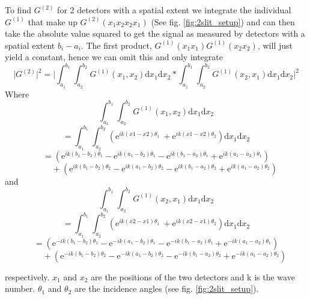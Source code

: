 \documentclass{article}
\begin{document}
To find \(G^{(2)}\) for 2 detectors with a spatial extent we integrate the individual \(G^{(1)}\) that make up \(G^{(2)}(x_1 x_2 x_2 x_1)\) (See fig. \ref{fig:2slit_setup}) and can then take the absolute value squared to get the signal as measured by detectors with a spatial extent \(b_i-a_i\). The first product, \(G^{(1)}(x_1 x_1) G^{(1)}(x_2 x_2)\), will just yield a constant, hence we can omit this and only integrate
\[\lvert G^{(2)}\rvert^2 =  \lvert{ \int_{a_1}^{b_1} \int_{a_2}^{b_2} G^{(1)}(x_1,x_2) \mathrm{d}x_1 \mathrm{d}x_2 * \int_{a_1}^{b_1} \int_{a_2}^{b_2} G^{(1)}(x_2,x_1) \mathrm{d}x_1 \mathrm{d}x_2 }\rvert^2\]
Where
\[\int_{a_1}^{b_1} \int_{a_2}^{b_2} G^{(1)}(x_1,x_2) \mathrm{d}x_1 \mathrm{d}x_2 \]
\[= \int_{a_1}^{b_1} \int_{a_2}^{b_2} (\mathrm{e}^{ik(x1-x2) \theta_1}\ + \mathrm{e}^{ik(x1-x2) \theta_2}) \mathrm{d}x_1 \mathrm{d}x_2 \]
\[= (\mathrm{e}^{ik(b_1-b_2)\theta_1}-\mathrm{e}^{ik(a_1-b_2)\theta_1}-\mathrm{e}^{ik(b_1-a_2)\theta_1}+\mathrm{e}^{ik(a_1-a_2)\theta_1}) \] 
\[\qquad + (\mathrm{e}^{ik(b_1-b_2)\theta_2}-\mathrm{e}^{ik(a_1-b_2)\theta_2}-\mathrm{e}^{ik(b_1-a_2)\theta_2}+\mathrm{e}^{ik(a_1-a_2)\theta_2})\]
and 
\[\int_{a_1}^{b_1} \int_{a_2}^{b_2} G^{(1)}(x_2,x_1) \mathrm{d}x_1 \mathrm{d}x_2 \]
\[= \int_{a_1}^{b_1} \int_{a_2}^{b_2} (\mathrm{e}^{ik(x2-x1) \theta_1}\ + \mathrm{e}^{ik(x2-x1) \theta_2}) \mathrm{d}x_1 \mathrm{d}x_2\]
\[=(\mathrm{e}^{-ik(b_1-b_2)\theta_1}-\mathrm{e}^{-ik(a_1-b_2)\theta_1}-\mathrm{e}^{-ik(b_1-a_2)\theta_1}+\mathrm{e}^{-ik(a_1-a_2)\theta_1}) \]
\[\qquad + (\mathrm{e}^{-ik(b_1-b_2)\theta_2}-\mathrm{e}^{-ik(a_1-b_2)\theta_2}-\mathrm{e}^{-ik(b_1-a_2)\theta_2}+\mathrm{e}^{-ik(a_1-a_2)\theta_2}) \]

respectively. $x_1$ and $x_2$ are the positions of the two detectors and k is the wave number. $\theta_1$ and $\theta_2$ are the incidence angles (see fig. \ref{fig:2slit_setup}).
\end{document}
